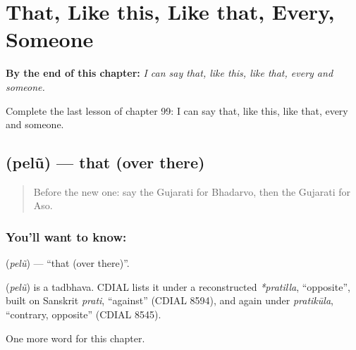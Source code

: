 
\chapter{That, Like this, Like that, Every, Someone}
\label{ch:gu-that-like-this-like-that-every-someone}

\begin{chapteropening}
\textbf{By the end of this chapter:} \emph{I can say that, like this, like that, every and someone.}

Complete the last lesson of chapter 99: I can say that, like this, like that, every and someone.
\end{chapteropening}

\section[\texorpdfstring{\gu{પેલું} (pelũ)}{પેલું (pelũ)}]{ (pelũ) — that (over there)}

\label{lesson:GU-C99-pelu}



\begin{quote}
Before the new one: say the Gujarati for Bhadarvo, then the Gujarati for Aso.
\end{quote}

\subsection*{You'll want to know: }
\textbf{} (\emph{pelũ}) — \textquotedblleft{}that (over there)\textquotedblright{}.

\begin{cousinweb}
\textbf{} (\emph{pelũ}) is a tadbhava. CDIAL lists it under a reconstructed \emph{*pratilla}, \textquotedblleft{}opposite\textquotedblright{}, built on Sanskrit \emph{prati}, \textquotedblleft{}against\textquotedblright{} (CDIAL 8594), and again under \emph{pratikūla}, \textquotedblleft{}contrary, opposite\textquotedblright{} (CDIAL 8545).
\end{cousinweb}

\begin{grammarlens}[title={What you've built}]
One more word for this chapter.
\end{grammarlens}


